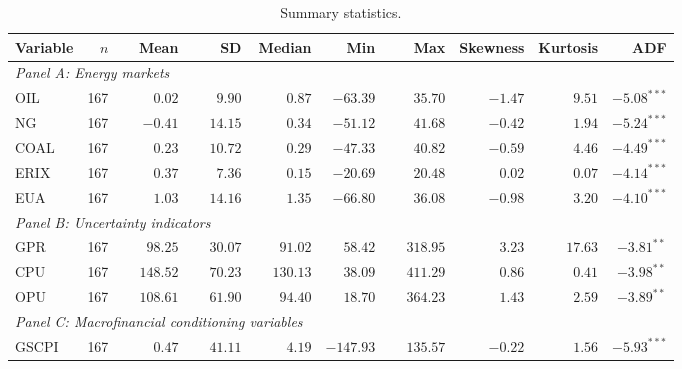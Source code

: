 \begin{table}[H]
\centering
\caption{Summary statistics.}
\label{tab:descriptive_statistics}
\begin{threeparttable}
\footnotesize
\setlength{\tabcolsep}{5pt}
\renewcommand{\arraystretch}{1.15}
\begin{tabular}{lrrrrrrrrr}
\toprule
Variable & $n$ & Mean & SD & Median & Min & Max & Skewness & Kurtosis & ADF \\
\midrule
\multicolumn{10}{l}{\textit{Panel A: Energy markets}} \\[2pt]
OIL & 167 & $\phantom{-}0.02$ & $\phantom{-}9.90$ & $\phantom{-}0.87$ & $-63.39$ & $\phantom{-}35.70$ & $-1.47$ & $\phantom{-}9.51$ & $-5.08^{***}$ \\
NG & 167 & $-0.41$ & $\phantom{-}14.15$ & $\phantom{-}0.34$ & $-51.12$ & $\phantom{-}41.68$ & $-0.42$ & $\phantom{-}1.94$ & $-5.24^{***}$ \\
COAL & 167 & $\phantom{-}0.23$ & $\phantom{-}10.72$ & $\phantom{-}0.29$ & $-47.33$ & $\phantom{-}40.82$ & $-0.59$ & $\phantom{-}4.46$ & $-4.49^{***}$ \\
ERIX & 167 & $\phantom{-}0.37$ & $\phantom{-}7.36$ & $\phantom{-}0.15$ & $-20.69$ & $\phantom{-}20.48$ & $\phantom{-}0.02$ & $\phantom{-}0.07$ & $-4.14^{***}$ \\
EUA & 167 & $\phantom{-}1.03$ & $\phantom{-}14.16$ & $\phantom{-}1.35$ & $-66.80$ & $\phantom{-}36.08$ & $-0.98$ & $\phantom{-}3.20$ & $-4.10^{***}$ \\
\midrule
\multicolumn{10}{l}{\textit{Panel B: Uncertainty indicators}} \\[2pt]
GPR & 167 & $\phantom{-}98.25$ & $\phantom{-}30.07$ & $\phantom{-}91.02$ & $\phantom{-}58.42$ & $\phantom{-}318.95$ & $\phantom{-}3.23$ & $\phantom{-}17.63$ & $-3.81^{**}$ \\
CPU & 167 & $\phantom{-}148.52$ & $\phantom{-}70.23$ & $\phantom{-}130.13$ & $\phantom{-}38.09$ & $\phantom{-}411.29$ & $\phantom{-}0.86$ & $\phantom{-}0.41$ & $-3.98^{**}$ \\
OPU & 167 & $\phantom{-}108.61$ & $\phantom{-}61.90$ & $\phantom{-}94.40$ & $\phantom{-}18.70$ & $\phantom{-}364.23$ & $\phantom{-}1.43$ & $\phantom{-}2.59$ & $-3.89^{**}$ \\
\midrule
\multicolumn{10}{l}{\textit{Panel C: Macrofinancial conditioning variables}} \\[2pt]
GSCPI & 167 & $\phantom{-}0.47$ & $\phantom{-}41.11$ & $\phantom{-}4.19$ & $-147.93$ & $\phantom{-}135.57$ & $-0.22$ & $\phantom{-}1.56$ & $-5.93^{***}$ \\

\end{tabular}
\end{threeparttable}
\end{table}
